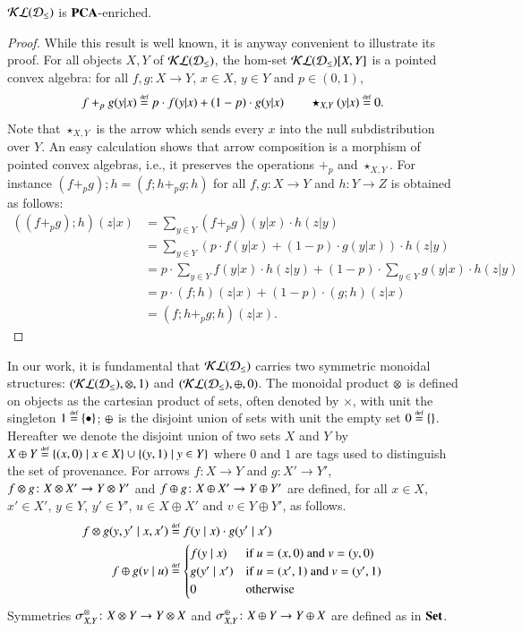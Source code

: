 \begin{proposition}
$\mathcal{KL}(\mathcal{D}_{\leq})$ is $\mathbf{PCA}$-enriched.
\end{proposition}
\begin{proof}
While this result is well known, it is anyway convenient to illustrate its proof. For all objects $X,Y$ of $\mathcal{KL}(\mathcal{D}_{\leq})$, the hom-set $\mathcal{KL}(\mathcal{D}_{\leq})[X,Y]$ is a pointed convex algebra: for all $f,g\colon X \to Y$, $x\in X$, $y\in Y$ and $p\in (0,1)$,
\[f +_p g(y|x)\stackrel{\text{\tiny def}}{=} p\cdot f(y|x) + (1-p)\cdot g(y|x) \qquad \star_{X,Y}(y|x) \stackrel{\text{\tiny def}}{=} 0.\] Note that $\star_{X,Y}$ is the arrow which sends every $x$ into the null subdistribution over $Y$. An easy calculation shows that arrow composition is a morphism of pointed convex algebras, i.e., it preserves the operations $+_p$ and $\star_{X,Y}$. For instance $(f+_pg) ;h= (f;h +_p g;h)$ for all $f,g\colon X \to Y$ and $h\colon Y \to Z$ is obtained as follows:
\begin{align}
    ((f+_pg) ;h)(z|x) &= \sum_{y\in Y} (f+_pg)(y|x) \cdot h(z|y) \tag*{} \\
    &= \sum_{y\in Y} (p\cdot f(y|x) + (1-p)\cdot g(y|x)) \cdot h(z|y) \tag*{}\\
    &= p\cdot \sum_{y\in Y} f(y|x) \cdot h(z|y) + (1-p)\cdot \sum_{y\in Y} g(y|x) \cdot h(z|y) \tag*{}\\
    &= p\cdot (f;h)(z|x) + (1-p)\cdot (g;h)(z|x) \tag*{}\\
    &= (f;h +_p g;h)(z|x)\text{.}\tag*{}
    \end{align}
\end{proof}




In our work, it is fundamental that $\mathcal{KL}(\mathcal{D}_{\leq})$ carries two symmetric monoidal structures: $ (\mathcal{KL}(\mathcal{D}_{\leq}), \otimes, 1)$ and $(\mathcal{KL}(\mathcal{D}_{\leq}), \oplus, 0)$. The monoidal product $\otimes$ is defined on objects as the cartesian product of sets, often denoted by $\times$, with unit the singleton $1 \stackrel{\text{\tiny def}}{=} \{\bullet\}$; $\oplus$ is the disjoint union of sets with unit the empty set $0 \stackrel{\text{\tiny def}}{=} \{\}$. Hereafter we denote the disjoint union of two sets $X$ and $Y$ by $X\oplus Y \stackrel{\text{\tiny def}}{=} \{(x,0) \mid x\in X\} \cup \{(y,1) \mid y \in Y\}$ where $0$ and $1$ are tags used to distinguish the set of provenance. For arrows  \(f \colon X \to Y\) and \(g \colon X' \to Y'\), $f\otimes g\colon X\otimes X' \to Y \otimes Y'$ and $f \oplus g \colon X\oplus X' \to Y\oplus Y'$ are defined, for all $x\in X$, $x'\in X'$, $y\in Y$, $y'\in Y'$, $u\in X\oplus X'$ and $v\in Y\oplus Y'$, as follows.
\begin{equation}\label{ex:products}
\begin{aligned}
f \otimes g(y,y' \mid x,x') &\stackrel{\text{\tiny def}}{=} f(y \mid x) \cdot g(y' \mid x')\\
f\oplus g(v \mid u) &\stackrel{\text{\tiny def}}{=} 
\begin{cases} 
f(y \mid x) & \text{if } u=(x,0) \text{ and } v=(y,0)\\ 
g(y' \mid x') & \text{if } u=(x',1) \text{ and } v=(y',1) \\  
0 & \text{otherwise} 
\end{cases}
\end{aligned}
\end{equation}
Symmetries $\symmt{X}{Y}\colon X \otimes Y \to Y \otimes X$ and $\symmp{X}{Y}\colon X \oplus Y \to Y \oplus X$ are defined as in $\mathbf{Set}$. 

